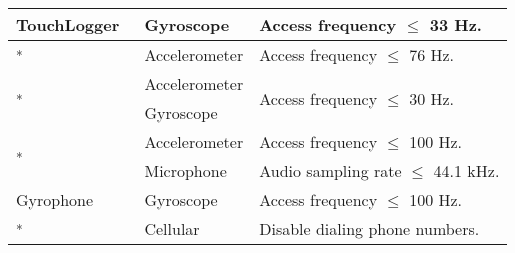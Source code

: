 \begin{table}
\begin{tabular}{|l|l|l|}
TouchLogger~\cite{cai2011touchlogger} & Gyroscope & Access 
frequency $\leq$ 33 Hz. \\ \hline

\cite{aviv2012practicality}\textsuperscript{*} & Accelerometer & Access 
frequency $\leq$ 76 Hz.  \\ \hline

\multirow{2}{*}{\cite{cai2012practicality}\textsuperscript{*}} & Accelerometer 
& \multirow{2}{*}{Access frequency $\leq$ 30 Hz.}  \\ \cline{2-2}
& Gyroscope &  \\ \hline

\multirow{2}{*}{\cite{liu2015good}\textsuperscript{*}}
& Accelerometer & Access frequency $\leq$ 100 Hz.   \\ \cline{2-3}
& Microphone  & Audio sampling rate $\leq$ 44.1 kHz. \\ \hline 

Gyrophone~\cite{michalevsky2014gyrophone} & Gyroscope 
& Access frequency $\leq$ 100 Hz.  \\ \hline

\cite{jiang2012isolating}\textsuperscript{*} & Cellular & Disable dialing phone numbers.   \\\hline


\end{tabular}
\end{table}
